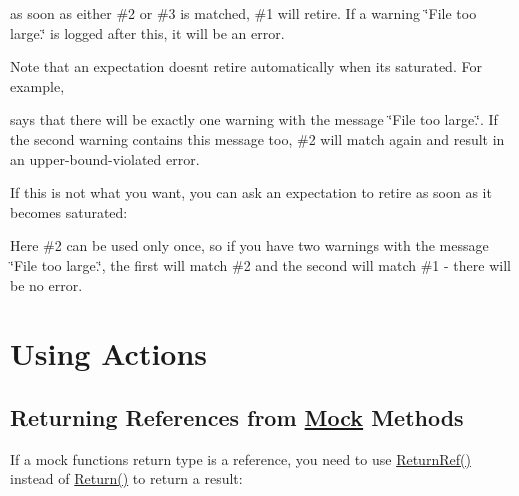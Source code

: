 as soon as either \#2 or \#3 is matched, \#1 will retire. If a warning {\ttfamily \char`\"{}\+File too large.\char`\"{}} is logged after this, it will be an error.

Note that an expectation doesn\textquotesingle{}t retire automatically when it\textquotesingle{}s saturated. For example,


\begin{DoxyCode}{0}
\end{DoxyCode}


says that there will be exactly one warning with the message {\ttfamily \char`\"{}\+File
too large.\char`\"{}}. If the second warning contains this message too, \#2 will match again and result in an upper-\/bound-\/violated error.

If this is not what you want, you can ask an expectation to retire as soon as it becomes saturated\+:


\begin{DoxyCode}{0}
\end{DoxyCode}


Here \#2 can be used only once, so if you have two warnings with the message {\ttfamily \char`\"{}\+File too large.\char`\"{}}, the first will match \#2 and the second will match \#1 -\/ there will be no error.

\section*{Using Actions}

\subsection*{Returning References from \mbox{\hyperlink{classMock}{Mock}} Methods}

If a mock function\textquotesingle{}s return type is a reference, you need to use {\ttfamily \mbox{\hyperlink{namespacetesting_a18eda8fe9c89ee856c199a2e04ca1641}{Return\+Ref()}}} instead of {\ttfamily \mbox{\hyperlink{namespacetesting_af6d1c13e9376c77671e37545cd84359c}{Return()}}} to return a result\+:


